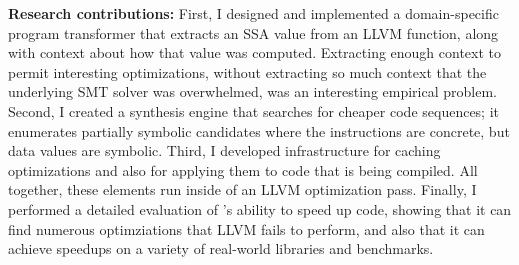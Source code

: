 \textbf{Research contributions:}
%
First, I designed and implemented a domain-specific program
transformer that extracts an SSA value from an LLVM function, along
with context about how that value was computed.
%
Extracting enough context to permit interesting optimizations, without
extracting so much context that the underlying SMT solver was
overwhelmed, was an interesting empirical problem.
%
Second, I created a synthesis engine that searches for cheaper code
sequences; it enumerates partially symbolic candidates where the
instructions are concrete, but data values are symbolic.
%
Third, I developed infrastructure for caching optimizations and also
for applying them to code that is being compiled.
%
All together, these elements run inside of an LLVM optimization pass.
%
Finally, I performed a detailed evaluation of \minotaur's ability to
speed up code, showing that it can find numerous optimziations that
LLVM fails to perform, and also that it can achieve speedups on a
variety of real-world libraries and benchmarks.

